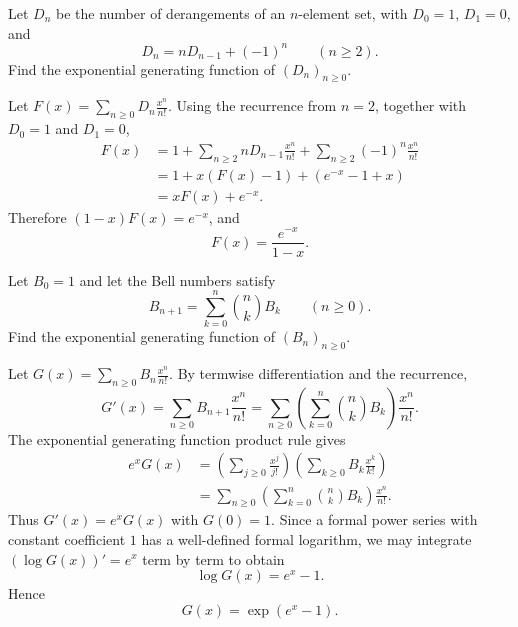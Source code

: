 \documentclass[11pt, oneside]{article}
\begin{document}
\begin{problem}
Let $D_n$ be the number of derangements of an $n$-element set, with
$D_0=1$, $D_1=0$, and
\[
D_n=nD_{n-1}+(-1)^n\qquad(n\ge2).
\]
Find the exponential generating function of $(D_n)_{n\ge0}$.
\end{problem}
\begin{solution}
Let $F(x)=\displaystyle\sum_{n\ge0}D_n\frac{x^n}{n!}$.
Using the recurrence from $n=2$, together with $D_0=1$ and $D_1=0$,
\[
\begin{aligned}
F(x)
&=1+\sum_{n\ge2}nD_{n-1}\frac{x^n}{n!}
  +\sum_{n\ge2}(-1)^n\frac{x^n}{n!}\\
&=1+x(F(x)-1)+(e^{-x}-1+x)\\
&=xF(x)+e^{-x}.
\end{aligned}
\]
Therefore $(1-x)F(x)=e^{-x}$, and
\[
\boxed{F(x)=\frac{e^{-x}}{1-x}.}
\]
\end{solution}

\begin{problem}
Let $B_0=1$ and let the Bell numbers satisfy
\[
B_{n+1}=\sum_{k=0}^{n}\binom nk B_k\qquad(n\ge0).
\]
Find the exponential generating function of $(B_n)_{n\ge0}$.
\end{problem}
\begin{solution}
Let $G(x)=\displaystyle\sum_{n\ge0}B_n\frac{x^n}{n!}$.
By termwise differentiation and the recurrence,
\[
G'(x)
=\sum_{n\ge0}B_{n+1}\frac{x^n}{n!}
=\sum_{n\ge0}\left(\sum_{k=0}^{n}\binom nk B_k\right)\frac{x^n}{n!}.
\]
The exponential generating function product rule gives
\[
\begin{aligned}
e^xG(x)
&=\left(\sum_{j\ge0}\frac{x^j}{j!}\right)
  \left(\sum_{k\ge0}B_k\frac{x^k}{k!}\right)\\
&=\sum_{n\ge0}\left(\sum_{k=0}^{n}\binom nk B_k\right)\frac{x^n}{n!}.
\end{aligned}
\]
Thus $G'(x)=e^xG(x)$ with $G(0)=1$.
Since a formal power series with constant coefficient $1$ has a
well-defined formal logarithm, we may integrate
$(\log G(x))'=e^x$ term by term to obtain
\[
\log G(x)=e^x-1.
\]
Hence
\[
\boxed{G(x)=\exp(e^x-1).}
\]
\end{solution}
\end{document}
